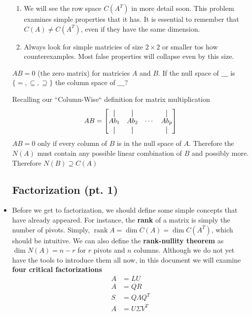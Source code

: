 \documentclass[11pt]{article}
\newcommand*{\vertbar}{\rule[-1ex]{0.5pt}{2.5ex}}
\begin{document}
\begin{itemize}
\begin{examplebox}[1.3]
\begin{solution}[1.3]
	\end{solution}
	\begin{takeaways}[1.3]\quad\vspace{-0.3cm}
		\begin{enumerate}
		    \item We will see the row space $C(A^{T})$ in more detail soon. This problem examines simple properties that it has. It is essential to remember that $C(A) \neq C(A^{T})$, even if they have the same dimension.
			\item Always look for simple matricies of size $2 \times 2$ or smaller tos how counterexamples. Most false properties will collapse even by this size.
		\end{enumerate}
	\end{takeaways}
    
\end{examplebox}

\begin{examplebox}[1.4]\quad
$AB = 0$ (the zero matrix) for matricies $A$ and $B$. If the null space of $\_\_\_$ is $\{=, \subseteq, \supseteq \}$ the column space of $\_\_\_$?
\begin{solution}[1.4]\quad\vspace{-0.3cm}
	Recalling our ``Column-Wise`` definition for matrix multiplication
			$$AB = \begin{bmatrix}   
			  \vertbar & \vertbar &  & \vertbar\\
			Ab_{1} & Ab_{2} & \cdots & Ab_{p}\\
			  \vertbar & \vertbar &  & \vertbar
			\end{bmatrix}$$
			$AB=0$ only if every column of $B$ is in the null space of $A$. Therefore the $N(A)$ must contain any possible linear combination of $B$ and possibly more. Therefore $N(B) \supseteq C(A)$
\end{solution} 
\end{examplebox}

\subsection{Factorization (pt. 1)}
\item Before we get to factorization, we should define some simple concepts that have already appeared. For instance, the \textbf{rank} of a matrix is simply the number of pivots. Simply, $\operatorname{rank} A = \dim C(A) = \dim C(A^{T})$, which should be intuitive. We can also define the \textbf{rank-nullity theorem} as $\dim N(A) = n-r$ for $r$ pivots and $n$ columns. Although we do not yet have the tools to introduce them all now, in this document we will examine \textbf{four critical factorizations}
	\begin{align}
		A &= LU \\
		A &= QR \\
		S &= Q \Lambda Q^{T} \\
		A &= U \Sigma V^{T}
	\end{align}

\end{itemize}
\end{document}
